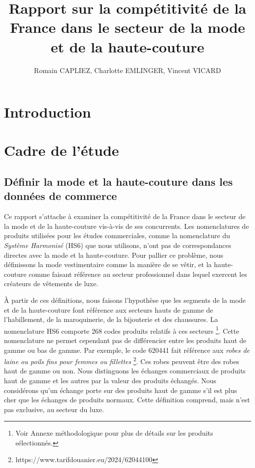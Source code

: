 \documentclass[french,10pt,a4paper]{article}
\title{Rapport sur la compétitivité de la France dans le secteur de la mode et de la haute-couture}
\author{Romain CAPLIEZ, Charlotte EMLINGER, Vincent VICARD}
\begin{document}
\maketitle

\newpage
{}
\tableofcontents
{}

\newpage

\section{Introduction}

\newpage

\section{Cadre de l'étude}

\subsection{Définir la mode et la haute-couture dans les données de commerce}
Ce rapport s'attache à examiner la compétitivité de la France dans le secteur de la mode et de la haute-couture vis-à-vis de ses concurrents. Les nomenclatures de produits utilisées pour les études commerciales, comme la nomenclature du \textit{Système Harmonisé} (HS6) que nous utilisons, n'ont pas de correspondances directes avec la mode et la haute-couture. Pour pallier ce problème, nous définissons la mode vestimentaire comme la manière de se vêtir, et la haute-couture comme faisant référence au secteur professionnel dans lequel exercent les créateurs de vêtements de luxe.

À partir de ces définitions, nous faisons l'hypothèse que les segments de la mode et de la haute-couture font référence aux secteurs hauts de gamme de l'habillement, de la maroquinerie, de la bijouterie et des chaussures. La nomenclature HS6 comporte 268 codes produits relatifs à ces secteurs \footnote{Voir Annexe méthodologique pour plus de détails sur les produits sélectionnés.}. Cette nomenclature ne permet cependant pas de différencier entre les produits haut de gamme ou bas de gamme. Par exemple, le code 620441 fait référence aux \textit{\og robes de laine ou poils fins pour femmes ou fillettes \fg{}} \footnote{https://www.tarifdouanier.eu/2024/62044100}. Ces robes peuvent être des robes haut de gamme ou non. Nous distinguons les échanges commerciaux de produits haut de gamme et les autres par la valeur des produits échangés. Nous considérons qu'un échange porte sur des produits haut de gamme s'il est plus cher que les échanges de produits \og normaux\fg{}. Cette définition comprend, mais n'est pas exclusive, au secteur du luxe.
\end{document}
